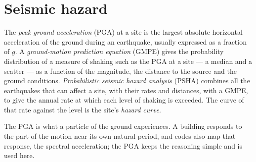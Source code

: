 \section{Seismic hazard}\label{sec:b2:geological-hazards:seismic}

\begin{definition}\label{def:b2:geological-hazards:psha}
The \emph{peak ground acceleration} (PGA) at a site is the largest
absolute horizontal acceleration of the ground during an earthquake, usually expressed as a
fraction of $g$. A \emph{ground-motion prediction equation} (GMPE) gives the probability distribution of a measure of shaking such as the PGA at a
site --- a median and a scatter --- as a function of the magnitude, the distance to the source
and the ground conditions. \emph{Probabilistic seismic hazard analysis} (PSHA) combines all the earthquakes that can affect a site, with their
rates and distances, with a GMPE, to give the annual rate at which each level of shaking is
exceeded. The curve of that rate against the level is the site's \emph{hazard
curve}.
\end{definition}

The PGA is what a particle of the ground experiences. A building responds to the part of the
motion near its own natural period, and codes also map that response, the spectral acceleration;
the PGA keeps the reasoning simple and is used here.

